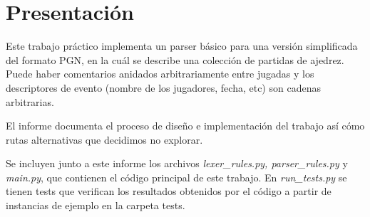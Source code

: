 \section{Presentación}

Este trabajo práctico implementa un parser básico para una versión simplificada del formato PGN, en la cuál se describe una colección de partidas de ajedrez. Puede haber comentarios anidados arbitrariamente entre jugadas y los descriptores de evento (nombre de los jugadores, fecha, etc) son cadenas arbitrarias.

El informe documenta el proceso de diseño e implementación del trabajo así cómo rutas alternativas que decidimos no explorar.

Se incluyen junto a este informe los archivos \textit{lexer\_rules.py, parser\_rules.py} y \textit{main.py}, que contienen el código principal de este trabajo. En \textit{run\_tests.py} se tienen tests que verifican los resultados obtenidos por el código a partir de instancias de ejemplo en la carpeta tests.